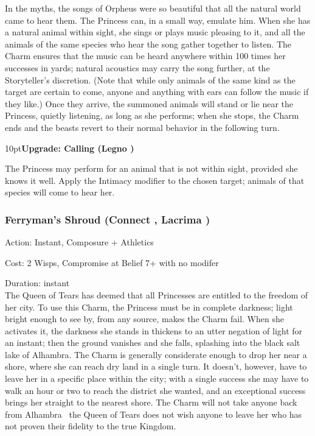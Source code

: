 In the myths, the songs of Orpheus were so beautiful that all the natural world came to hear them. The Princess can, in a small way, emulate him. When she has a natural animal within sight, she sings or plays music pleasing to it, and all the animals of the same species who hear the song gather together to listen. The Charm ensures that the music can be heard anywhere within 100 times her successes in yards; natural acoustics may carry the song further, at the Storyteller's discretion. (Note that while only animals of the same kind as the target are certain to come, anyone and anything with ears can follow the music if they like.) Once they arrive, the summoned animals will stand or lie near the Princess, quietly listening, as long as she performs; when she stops, the Charm ends and the beasts revert to their normal behavior in the following turn.

\begin{myindentpar}{10pt}\textbf{Upgrade: Calling (Legno  \textbullet\textbullet\textbullet)}

The Princess may perform for an animal that is not within sight, provided she knows it well. Apply the Intimacy modifier to the chosen target; animals of that species will come to hear her.\end{myindentpar}

\subsubsection*{Ferryman's Shroud (Connect \textbullet\textbullet\textbullet, Lacrima \textbullet)}

\noindent Action: Instant, Composure + Athletics

\noindent Cost: 2 Wisps, Compromise at Belief 7+ with no modifer

\noindent Duration: instant \\

\noindent The Queen of Tears has deemed that all Princesses are entitled to the freedom of her city. To use this Charm, the Princess must be in complete darkness; light bright enough to see by, from any source, makes the Charm fail. When she activates it, the darkness she stands in thickens to an utter negation of light for an instant; then the ground vanishes and she falls, splashing into the black salt lake of Alhambra. The Charm is generally considerate enough to drop her near a shore, where she can reach dry land in a single turn. It doesn't, however, have to leave her in a specific place within the city; with a single success she may have to walk an hour or two to reach the district she wanted, and an exceptional success brings her straight to the nearest shore. The Charm will not take anyone back from Alhambra \textendash\, the Queen of Tears does not wish anyone to leave her who has not proven their fidelity to the true Kingdom.

